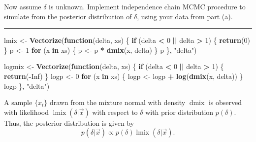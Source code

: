 \documentclass[
  11pt,
]{paper}
\newenvironment{Shaded}{\begin{snugshade}}{\end{snugshade}}
\newcommand{\ConstantTok}[1]{\textcolor[rgb]{0.56,0.35,0.01}{#1}}
\newcommand{\ControlFlowTok}[1]{\textcolor[rgb]{0.13,0.29,0.53}{\textbf{#1}}}
\newcommand{\DecValTok}[1]{\textcolor[rgb]{0.00,0.00,0.81}{#1}}
\newcommand{\FunctionTok}[1]{\textcolor[rgb]{0.13,0.29,0.53}{\textbf{#1}}}
\newcommand{\NormalTok}[1]{#1}
\newcommand{\OtherTok}[1]{\textcolor[rgb]{0.56,0.35,0.01}{#1}}
\newcommand{\SpecialCharTok}[1]{\textcolor[rgb]{0.81,0.36,0.00}{\textbf{#1}}}
\newcommand{\StringTok}[1]{\textcolor[rgb]{0.31,0.60,0.02}{#1}}
\begin{document}
Now assume \(\delta\) is unknown. Implement independence chain MCMC
procedure to simulate from the posterior distribution of \(\delta\),
using your data from part (a).

\begin{center}\rule{0.5\linewidth}{0.5pt}\end{center}

\begin{Shaded}
\begin{Highlighting}[]
\NormalTok{lmix }\OtherTok{\textless{}{-}} \FunctionTok{Vectorize}\NormalTok{(}\ControlFlowTok{function}\NormalTok{(delta, xs) \{}
    \ControlFlowTok{if}\NormalTok{ (delta }\SpecialCharTok{\textless{}} \DecValTok{0} \SpecialCharTok{||}\NormalTok{ delta }\SpecialCharTok{\textgreater{}} \DecValTok{1}\NormalTok{) \{}
        \FunctionTok{return}\NormalTok{(}\DecValTok{0}\NormalTok{)}
\NormalTok{    \}}
\NormalTok{    p }\OtherTok{\textless{}{-}} \DecValTok{1}
    \ControlFlowTok{for}\NormalTok{ (x }\ControlFlowTok{in}\NormalTok{ xs) \{}
\NormalTok{        p }\OtherTok{\textless{}{-}}\NormalTok{ p }\SpecialCharTok{*} \FunctionTok{dmix}\NormalTok{(x, delta)}
\NormalTok{    \}}
\NormalTok{    p}
\NormalTok{\}, }\StringTok{"delta"}\NormalTok{)}

\NormalTok{logmix }\OtherTok{\textless{}{-}} \FunctionTok{Vectorize}\NormalTok{(}\ControlFlowTok{function}\NormalTok{(delta, xs) \{}
    \ControlFlowTok{if}\NormalTok{ (delta }\SpecialCharTok{\textless{}} \DecValTok{0} \SpecialCharTok{||}\NormalTok{ delta }\SpecialCharTok{\textgreater{}} \DecValTok{1}\NormalTok{) \{}
        \FunctionTok{return}\NormalTok{(}\SpecialCharTok{{-}}\ConstantTok{Inf}\NormalTok{)}
\NormalTok{    \}}
\NormalTok{    logp }\OtherTok{\textless{}{-}} \DecValTok{0}
    \ControlFlowTok{for}\NormalTok{ (x }\ControlFlowTok{in}\NormalTok{ xs) \{}
\NormalTok{        logp }\OtherTok{\textless{}{-}}\NormalTok{ logp }\SpecialCharTok{+} \FunctionTok{log}\NormalTok{(}\FunctionTok{dmix}\NormalTok{(x, delta))}
\NormalTok{    \}}
\NormalTok{    logp}
\NormalTok{\}, }\StringTok{"delta"}\NormalTok{)}
\end{Highlighting}
\end{Shaded}

A sample \(\{x_t\}\) drawn from the mixture normal with density
\(\operatorname{dmix}\) is observed with likelihood
\(\operatorname{lmix}(\delta|\vec{x})\) with respect to \(\delta\) with
prior distribution \(p(\delta)\). Thus, the posterior distribution is
given by \[
  p(\delta|\vec{x}) \propto p(\delta) \operatorname{lmix}(\delta|\vec{x}).
\]
\end{document}
